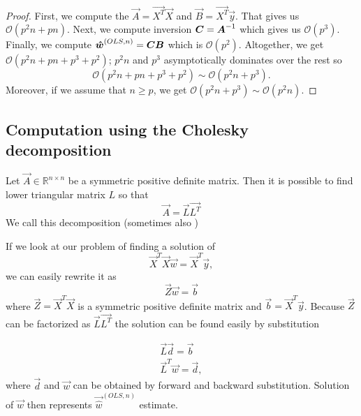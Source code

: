 \begin{proof}
First, we compute the
$\vec{A} = \vec{X^T}\vec{X}$  and
$\vec{B} = \vec{X^T}\vec{y}$. 
That gives us $\mathcal{O}(p^2n + pn)$.
Next, we compute inversion $\m{C} = \m{A}^{-1}$ which gives us $\mathcal{O}(p^3)$.
Finally, we compute
$ \vec{\hat{w}}^{(OLS,n)} = \m{C}\m{B}$ which is $\mathcal{O}(p^2)$. 
Altogether, we get $ \mathcal{O}(p^2n + pn + p^3 + p^2)$;
$p^2n$ and $p^3$ asymptotically dominates over the rest so 
\begin{equation}
\mathcal{O}(p^2n + pn + p^3 + p^2) \sim \mathcal{O}(p^2n + p^3).
\end{equation}
Moreover, if we assume that $n \ge p$, we get $\mathcal{O}(p^2n + p^3) \sim \mathcal{O}(p^2n)$.
\end{proof}




\subsection{Computation using the Cholesky decomposition}

Let $\vec{A} \in \mathbb{R}^{n \times n}$ be a symmetric positive definite matrix. Then it is possible to find lower triangular matrix $L$ so that 
\begin{equation}
    \vec{A} = \vec{L}\vec{L^T}
\end{equation}
We call this decomposition  (sometimes also  )
    
If we look at our problem of finding a solution of 
\begin{equation}
    \vec{X}^T\vec{X}\vec{w} = \vec{X}^T\vec{y},
\end{equation}
we can easily rewrite it as 
\begin{equation}
    \vec{Z}\vec{w} = \vec{b}
\end{equation}
where $\vec{Z} = \vec{X}^T\vec{X}$ is a symmetric positive definite matrix and $\vec{b} = \vec{X}^T\vec{y} $. Because $\vec{Z}$ can be factorized as $\vec{L}\vec{L^T}$ the solution can be found easily by substitution

\begin{align}
    \vec{L}\vec{d} = \vec{b} \\
    \vec{L}^T\vec{w} = \vec{d},
\end{align}
where $\vec{d}$ and $\vec{w}$ can be obtained by forward and backward substitution. Solution of $\vec{w}$ then represents $\vec{\hat{w}}^{(OLS,n)}$ estimate.


